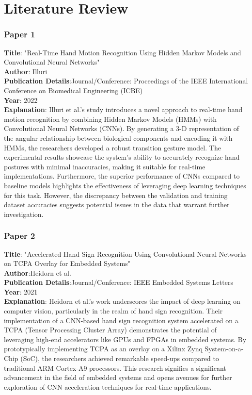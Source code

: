 \chapter{Literature Review}
\subsection{Paper 1} \textbf{Title}: "Real-Time Hand Motion Recognition Using Hidden Markov Models and Convolutional Neural Networks" \\
\textbf{Author}: Illuri \\
\textbf{Publication Details}:Journal/Conference: Proceedings of the IEEE International Conference on Biomedical Engineering (ICBE)
 \\
\textbf{Year}: 2022 \\
\textbf{Explanation}: Illuri et al.'s study introduces a novel approach to real-time hand motion recognition by combining Hidden Markov Models (HMMs) with Convolutional Neural Networks (CNNs). By generating a 3-D representation of the angular relationship between biological components and encoding it with HMMs, the researchers developed a robust transition gesture model. The experimental results showcase the system's ability to accurately recognize hand postures with minimal inaccuracies, making it suitable for real-time implementations. Furthermore, the superior performance of CNNs compared to baseline models highlights the effectiveness of leveraging deep learning techniques for this task. However, the discrepancy between the validation and training dataset accuracies suggests potential issues in the data that warrant further investigation.


\subsection{Paper 2} \textbf{Title}: "Accelerated Hand Sign Recognition Using Convolutional Neural Networks on TCPA Overlay for Embedded Systems"
 \\
\textbf{Author}:Heidorn et al.
 \\
\textbf{Publication Details}:Journal/Conference: IEEE Embedded Systems Letters
 \\
\textbf{Year}: 2021 \\
\textbf{Explanation}: Heidorn et al.'s work underscores the impact of deep learning on computer vision, particularly in the realm of hand sign recognition. Their implementation of a CNN-based hand sign recognition system accelerated on a TCPA (Tensor Processing Cluster Array) demonstrates the potential of leveraging high-end accelerators like GPUs and FPGAs in embedded systems. By prototypically implementing TCPA as an overlay on a Xilinx Zynq System-on-a-Chip (SoC), the researchers achieved remarkable speed-ups compared to traditional ARM Cortex-A9 processors. This research signifies a significant advancement in the field of embedded
systems and opens avenues for further exploration of CNN acceleration techniques for real-time applications.


